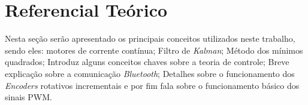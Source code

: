\chapter[Referencial Teórico]{Referencial Teórico}
\label{ch:referencial_teorico}

Nesta seção serão apresentado os principais conceitos utilizados neste trabalho, sendo eles: motores de corrente contínua; Filtro de \emph{Kalman}; Método dos mínimos quadrados; Introduz alguns conceitos chaves sobre a teoria de controle; Breve explicação sobre a comunicação \emph{Bluetooth}; Detalhes sobre o funcionamento dos \emph{Encoders} rotativos incrementais e por fim fala sobre o funcionamento básico dos sinais PWM.







